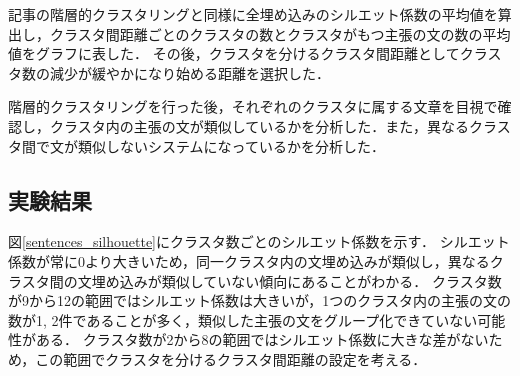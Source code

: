 \documentclass[12pt,a4j]{jreport}
\begin{document}


記事の階層的クラスタリングと同様に全埋め込みのシルエット係数の平均値を算出し，クラスタ間距離ごとのクラスタの数とクラスタがもつ主張の文の数の平均値をグラフに表した．
その後，クラスタを分けるクラスタ間距離としてクラスタ数の減少が緩やかになり始める距離を選択した．

階層的クラスタリングを行った後，それぞれのクラスタに属する文章を目視で確認し，クラスタ内の主張の文が類似しているかを分析した．また，異なるクラスタ間で文が類似しないシステムになっているかを分析した．


\subsection{実験結果}

図\ref{sentences_silhouette}にクラスタ数ごとのシルエット係数を示す．
シルエット係数が常に0より大きいため，同一クラスタ内の文埋め込みが類似し，異なるクラスタ間の文埋め込みが類似していない傾向にあることがわかる．
クラスタ数が9から12の範囲ではシルエット係数は大きいが，1つのクラスタ内の主張の文の数が1, 2件であることが多く，類似した主張の文をグループ化できていない可能性がある．
クラスタ数が2から8の範囲ではシルエット係数に大きな差がないため，この範囲でクラスタを分けるクラスタ間距離の設定を考える．
\end{document}
